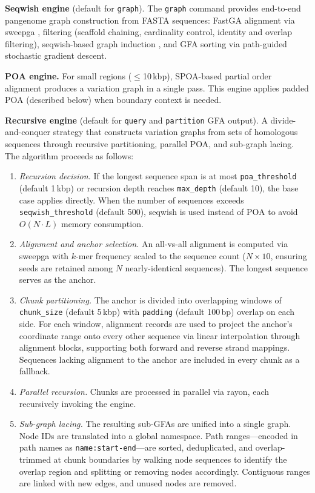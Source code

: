 \textbf{Seqwish engine} (default for \texttt{graph}). The \texttt{graph} command provides end-to-end pangenome graph construction from FASTA sequences: FastGA alignment via sweepga \cite{sweepga}, filtering (scaffold chaining, cardinality control, identity and overlap filtering), seqwish-based graph induction \cite{garrison2023seqwish}, and GFA sorting via path-guided stochastic gradient descent.

\textbf{POA engine.} For small regions ($\leq$10\,kbp), SPOA-based \cite{Vaser2017} partial order alignment produces a variation graph in a single pass. This engine applies padded POA (described below) when boundary context is needed.

\textbf{Recursive engine} (default for \texttt{query} and \texttt{partition} GFA output). A divide-and-conquer strategy that constructs variation graphs from sets of homologous sequences through recursive partitioning, parallel POA, and sub-graph lacing. The algorithm proceeds as follows:

\begin{enumerate}
\item \textit{Recursion decision.} If the longest sequence span is at most \texttt{poa\_threshold} (default 1\,kbp) or recursion depth reaches \texttt{max\_depth} (default 10), the base case applies directly. When the number of sequences exceeds \texttt{seqwish\_threshold} (default 500), seqwish is used instead of POA to avoid $O(N \cdot L)$ memory consumption.

\item \textit{Alignment and anchor selection.} An all-vs-all alignment is computed via sweepga with $k$-mer frequency scaled to the sequence count ($N \times 10$, ensuring seeds are retained among $N$ nearly-identical sequences). The longest sequence serves as the anchor.

\item \textit{Chunk partitioning.} The anchor is divided into overlapping windows of \texttt{chunk\_size} (default 5\,kbp) with \texttt{padding} (default 100\,bp) overlap on each side. For each window, alignment records are used to project the anchor's coordinate range onto every other sequence via linear interpolation through alignment blocks, supporting both forward and reverse strand mappings. Sequences lacking alignment to the anchor are included in every chunk as a fallback.

\item \textit{Parallel recursion.} Chunks are processed in parallel via rayon, each recursively invoking the engine.

\item \textit{Sub-graph lacing.} The resulting sub-GFAs are unified into a single graph. Node IDs are translated into a global namespace. Path ranges---encoded in path names as \texttt{name:start-end}---are sorted, deduplicated, and overlap-trimmed at chunk boundaries by walking node sequences to identify the overlap region and splitting or removing nodes accordingly. Contiguous ranges are linked with new edges, and unused nodes are removed.
\end{enumerate}

